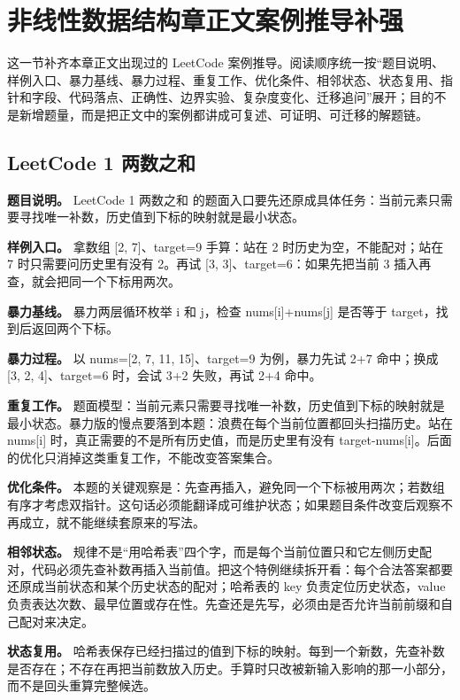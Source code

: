 \section{非线性数据结构章正文案例推导补强}

这一节补齐本章正文出现过的 LeetCode 案例推导。阅读顺序统一按“题目说明、样例入口、暴力基线、暴力过程、重复工作、优化条件、相邻状态、状态复用、指针和字段、代码落点、正确性、边界实验、复杂度变化、迁移追问”展开；目的不是新增题量，而是把正文中的案例都讲成可复述、可证明、可迁移的解题链。

\subsection{LeetCode 1 两数之和}

\textbf{题目说明。} LeetCode 1 两数之和 的题面入口要先还原成具体任务：当前元素只需要寻找唯一补数，历史值到下标的映射就是最小状态。

\textbf{样例入口。} 拿数组 [2, 7]、target=9 手算：站在 2 时历史为空，不能配对；站在 7 时只需要问历史里有没有 2。再试 [3, 3]、target=6：如果先把当前 3 插入再查，就会把同一个下标用两次。

\textbf{暴力基线。} 暴力两层循环枚举 i 和 j，检查 nums[i]+nums[j] 是否等于 target，找到后返回两个下标。

\textbf{暴力过程。} 以 nums=[2, 7, 11, 15]、target=9 为例，暴力先试 2+7 命中；换成 [3, 2, 4]、target=6 时，会试 3+2 失败，再试 2+4 命中。

\textbf{重复工作。} 题面模型：当前元素只需要寻找唯一补数，历史值到下标的映射就是最小状态。暴力版的慢点要落到本题：浪费在每个当前位置都回头扫描历史。站在 nums[i] 时，真正需要的不是所有历史值，而是历史里有没有 target-nums[i]。后面的优化只消掉这类重复工作，不能改变答案集合。

\textbf{优化条件。} 本题的关键观察是：先查再插入，避免同一个下标被用两次；若数组有序才考虑双指针。这句话必须能翻译成可维护状态；如果题目条件改变后观察不再成立，就不能继续套原来的写法。

\textbf{相邻状态。} 规律不是“用哈希表”四个字，而是每个当前位置只和它左侧历史配对，代码必须先查补数再插入当前值。把这个特例继续拆开看：每个合法答案都要还原成当前状态和某个历史状态的配对；哈希表的 key 负责定位历史状态，value 负责表达次数、最早位置或存在性。先查还是先写，必须由是否允许当前前缀和自己配对来决定。

\textbf{状态复用。} 哈希表保存已经扫描过的值到下标的映射。每到一个新数，先查补数是否存在；不存在再把当前数放入历史。手算时只改被新输入影响的那一小部分，而不是回头重算完整候选。

